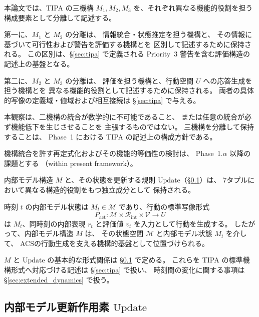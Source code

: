 \begin{observation}[$M_1/M_2/M_3$ の機能的分離方針]
\label{obs:tipa_integration}

本論文では、TIPA の三機構
$M_1,M_2,M_3$ を、それぞれ異なる機能的役割を担う
構成要素として分離して記述する。

第一に、$M_1$ と $M_2$ の分離は、
情報統合・状態推定を担う機構と、
その情報に基づいて可行性および警告を評価する機構とを
区別して記述するために保持される。
この区別は、\S\ref{sec:tipa} で定義される
Priority~3 警告を含む評価構造の記述上の基盤となる。

第二に、$M_2$ と $M_3$ の分離は、
評価を担う機構と、行動空間 $U$ への応答生成を担う機構とを
異なる機能的役割として記述するために保持される。
両者の具体的写像の定義域・値域および相互接続は
\S\ref{sec:tipa} で与える。

本観察は、二機構の統合が数学的に不可能であること、
または任意の統合が必ず機能低下を生じさせることを
主張するものではない。
三機構を分離して保持することは、
Phase~1 における TIPA の記述上の構成方針である。

機構統合を許す再定式化およびその機能的等価性の検討は、
Phase~1.$\alpha$ 以降の課題とする
（within present framework）。
\end{observation}

\begin{remark}
\label{rem:M_update_relation}

内部モデル構造 $M$ と、その状態を更新する規則
$\mathrm{Update}$（\S\ref{subsec:update_operator}）は、
7タプルにおいて異なる構造的役割をもつ独立成分として
保持される。

時刻 $t$ の内部モデル状態は
$M_t\in\mathcal{M}$
であり、行動の標準写像形式
\[
  P_{\mathrm{act}}:\mathcal M\times\mathcal R_{\mathrm{int}}\times\mathcal V\to U
\]
は $M_t$、同時刻の内部表現 $r_t$ と評価値 $v_t$ を入力として行動を生成する。
したがって、内部モデル構造 $M$ は、
その状態空間 $\mathcal{M}$ と内部モデル状態 $M_t$ を介して、
ACSの行動生成を支える機構的基盤として位置づけられる。

$M$ と $\mathrm{Update}$ の基本的な形式関係は
\S\ref{subsec:update_operator} で定める。
これらを TIPA の標準機構形式へ対応づける記述は
\S\ref{sec:tipa} で扱い、
時刻間の変化に関する事項は
\S\ref{sec:extended_dynamics} で扱う。
\end{remark}

\subsection{内部モデル更新作用素 $\mathrm{Update}$}
\label{subsec:update_operator}

